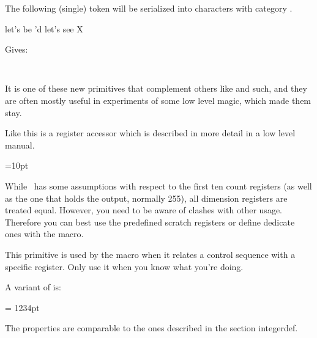 \typebuffer

\startlines \tttf \getbuffer \stoplines

\stopoldprimitive

\startnewprimitive[title={\prm {detokenized}}]

The following (single) token will be serialized into characters with category
.

\startbuffer
{}
\def\foo{let's be \relax'd}
\def\oof#1{let's see #1}
\detokenized{}
\detokenized\foo
\detokenized\oof
\detokenized\setbox
\detokenized X
\stopbuffer

\typebuffer

Gives:

\startlines\tt
\getbuffer
\stoplines

It is one of these new primitives that complement others like 
and such, and they are often mostly useful in experiments of some low level
magic, which made them stay.

\stopnewprimitive

\startoldprimitive[title={\prm {dimen}}]

Like  this is a register accessor which is described in more
detail in a low level manual.

\starttyping
{}=10pt
\stoptyping

While \TEX\ has some assumptions with respect to the first ten count registers
(as well as the one that holds the output, normally 255), all dimension registers
are treated equal. However, you need to be aware of clashes with other usage.
Therefore you can best use the predefined scratch registers or define dedicate
ones with the \type {\newdimen} macro.

\stopoldprimitive

\startoldprimitive[title={\prm {dimendef}}]

This primitive is used by the \type {\newdimen} macro when it relates a control
sequence with a specific register. Only use it when you know what you're doing.

\stopoldprimitive

\startnewprimitive[title={\prm {dimensiondef}}]

A variant of  is:

\starttyping
\dimensiondef\MyDimen = 1234pt
\stoptyping

The properties are comparable to the ones described in the section \prm
{integerdef}.

\stopnewprimitive

